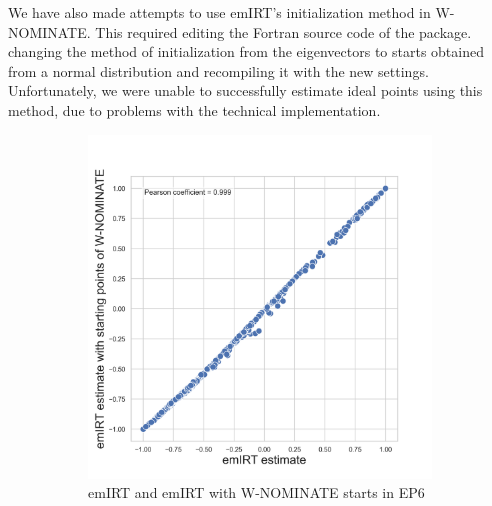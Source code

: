 \documentclass[a4paper,12pt]{report}
\begin{document}
    We have also made attempts to use emIRT's initialization method in W-NOMINATE. This required editing the Fortran
    source code of the package.
    changing the method of initialization from the eigenvectors to starts obtained from a
    normal distribution and recompiling it with the new settings.
    Unfortunately, we were unable to successfully
    estimate ideal points using this method, due to problems with the technical implementation.
    \begin{figure}[H]
        \centering
        \begin{subfigure}[b]{0.48\textwidth}
            \centering
            \includegraphics[width=\textwidth]{Graphs/ScatterEMEIGEN6}
            \caption{emIRT and emIRT with W-NOMINATE starts in EP6}
            \label{fig:EMEIGEN_SCATTER_6}
        \end{subfigure}
        \hfill
        \begin{subfigure}[b]{0.48\textwidth}
            \centering

\end{subfigure}
\end{figure}
\end{document}
